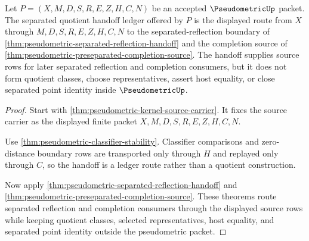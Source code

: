 \begin{theorem}
\label{thm:pseudometric-separated-quotient-handoff}
Let $P=(X,M,D,S,R,E,Z,H,C,N)$ be an accepted $\PseudometricUp$ packet. The separated quotient handoff ledger offered by $P$ is the displayed route from $X$ through $M,D,S,R,E,Z,H,C,N$ to the separated-reflection boundary of \autoref{thm:pseudometric-separated-reflection-handoff} and the completion source of \autoref{thm:pseudometric-preseparated-completion-source}. The handoff supplies source rows for later separated reflection and completion consumers, but it does not form quotient classes, choose representatives, assert host equality, or close separated point identity inside $\PseudometricUp$.
\end{theorem}
\begin{proof}
Start with \autoref{thm:pseudometric-kernel-source-carrier}. It fixes the source carrier as the displayed finite packet $X,M,D,S,R,E,Z,H,C,N$.

Use \autoref{thm:pseudometric-classifier-stability}. Classifier comparisons and zero-distance boundary rows are transported only through $H$ and replayed only through $C$, so the handoff is a ledger route rather than a quotient construction.

Now apply \autoref{thm:pseudometric-separated-reflection-handoff} and \autoref{thm:pseudometric-preseparated-completion-source}. These theorems route separated reflection and completion consumers through the displayed source rows while keeping quotient classes, selected representatives, host equality, and separated point identity outside the pseudometric packet.
\end{proof}

